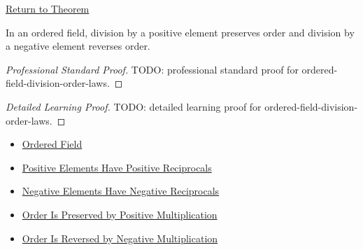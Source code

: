 \newpage
{}
\label{prf:ordered-field-division-order-laws}

\begin{remark*}[Return]
\hyperref[lem:ordered-field-division-order-laws]{Return to Theorem}
\end{remark*}

\begin{lemma*}
In an ordered field, division by a positive element preserves order and
division by a negative element reverses order.
\end{lemma*}

\begin{proof}[Professional Standard Proof]
\LRAProofBodyStart
TODO: professional standard proof for ordered-field-division-order-laws.
\end{proof}

\begin{proof}[Detailed Learning Proof]
\LRAProofBodyStart
TODO: detailed learning proof for ordered-field-division-order-laws.
\end{proof}

\begin{remark*}
\end{remark*}

\begin{dependencies}
\begin{itemize}
  \item \hyperref[def:ordered-field]{Ordered Field}
  \item \hyperref[thm:ordered-field-positive-reciprocals]{Positive Elements Have Positive Reciprocals}
  \item \hyperref[thm:ordered-field-negative-reciprocals]{Negative Elements Have Negative Reciprocals}
  \item \hyperref[thm:ordered-field-positive-multiplication-preserves-order]{Order Is Preserved by Positive Multiplication}
  \item \hyperref[thm:ordered-field-negative-multiplication-reverses-order]{Order Is Reversed by Negative Multiplication}
\end{itemize}
\end{dependencies}

\clearpage

